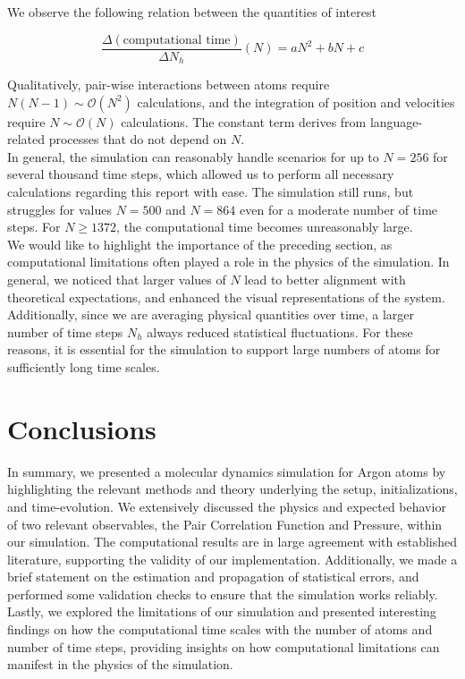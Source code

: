 \documentclass[twocolumn,10pt]{article}
\begin{document}
We observe the following relation between the quantities of interest

\begin{equation*}
        \frac{\Delta(\text{computational time})}{\Delta N_h} (N) = aN^2 + bN + c
\end{equation*}

Qualitatively, pair-wise interactions between atoms require $N(N-1) \sim \mathcal{O}(N^2)$ calculations, and the integration of position and velocities require $N \sim \mathcal{O}(N)$ calculations. The constant term derives from language-related processes that do not depend on $N$.\\

In general, the simulation can reasonably handle scenarios for up to $N=256$ for several thousand time steps, which allowed us to perform all necessary calculations regarding this report with ease. The simulation still runs, but struggles for values $N=500$ and $N=864$ even for a moderate number of time steps. For $N\geq1372$, the computational time becomes unreasonably large.\\

We would like to highlight the importance of the preceding section, as computational limitations often played a role in the physics of the simulation. In general, we noticed that larger values of $N$ lead to better alignment with theoretical expectations, and enhanced the visual representations of the system. Additionally, since we are averaging physical quantities over time, a larger number of time steps $N_h$ always reduced statistical fluctuations. For these reasons, it is essential for the simulation to support large numbers of atoms for sufficiently long time scales.

\section{Conclusions}

In summary, we presented a molecular dynamics simulation for Argon atoms by highlighting the relevant methods and theory underlying the setup, initializations, and time-evolution. We extensively discussed the physics and expected behavior of two relevant observables, the Pair Correlation Function and Pressure, within our simulation. The computational results are in large agreement with established literature, supporting the validity of our implementation. Additionally, we made a brief statement on the estimation and propagation of statistical errors, and performed some validation checks to ensure that the simulation works reliably. Lastly, we explored the limitations of our simulation and presented interesting findings on how the computational time scales with the number of atoms and number of time steps, providing insights on how computational limitations can manifest in the physics of the simulation. 



\end{document}
